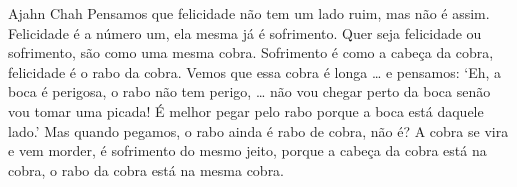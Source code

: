 
\begin{quotepage}{0.67\linewidth}{Ajahn Chah}
Pensamos que felicidade não tem um lado ruim, mas não é assim.
Felicidade é a número um, ela mesma já é sofrimento. Quer seja
felicidade ou sofrimento, são como uma mesma cobra. Sofrimento é como a
cabeça da cobra, felicidade é o rabo da cobra. Vemos que essa cobra é
longa \ldots{} e pensamos: ‘Eh, a boca é perigosa, o rabo não tem perigo,
\ldots{} não vou chegar perto da boca senão vou tomar uma picada! É melhor
pegar pelo rabo porque a boca está daquele lado.’ Mas quando pegamos, o
rabo ainda é rabo de cobra, não é? A cobra se vira e vem morder, é
sofrimento do mesmo jeito, porque a cabeça da cobra está na cobra, o
rabo da cobra está na mesma cobra.
\end{quotepage}

